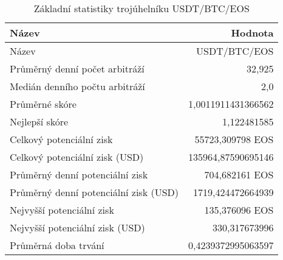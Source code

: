 \begin{table}\centering
\caption{Základní statistiky trojúhelníku USDT/BTC/EOS}
\label{USDTBTCEOS_stats}
\begin{tabular}{|| l | r ||}
\hline Název & Hodnota \\ 
\hline\hline Název & USDT/BTC/EOS \\ 
\hline Průměrný denní počet arbitráží & 32,925 \\ 
\hline Medián denního počtu arbitráží & 2,0 \\ 
\hline Průměrné skóre & 1,0011911431366562 \\ 
\hline Nejlepší skóre & 1,122481585 \\ 
\hline Celkový potenciální zisk & 55723,309798 EOS \\ 
\hline Celkový potenciální zisk (USD) & 135964,87590695146 \\ 
\hline Průměrný denní potenciální zisk & 704,682161 EOS \\ 
\hline Průměrný denní potenciální zisk (USD) & 1719,424472664939 \\ 
\hline Nejvyšší potenciální zisk & 135,376096 EOS \\ 
\hline Nejvyšší potenciální zisk (USD) & 330,317673996 \\ 
\hline Průměrná doba trvání & 0,4239372995063597 \\ 
\hline
\end{tabular}
\end{table}